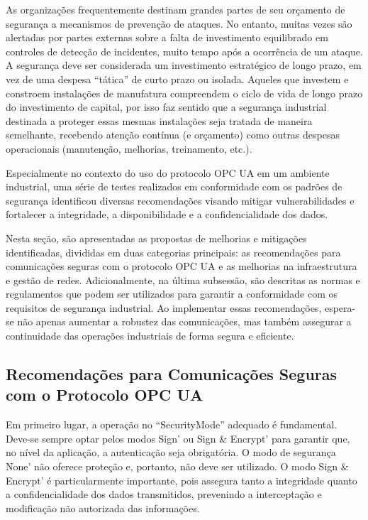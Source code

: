     As organizações frequentemente destinam grandes partes de seu orçamento de segurança a mecanismos de prevenção de ataques. No entanto, muitas vezes são alertadas por partes externas sobre a falta de investimento equilibrado em controles de detecção de incidentes, muito tempo após a ocorrência de um ataque. A segurança deve ser considerada um investimento estratégico de longo prazo, em vez de uma despesa ``tática'' de curto prazo ou isolada. Aqueles que investem e constroem instalações de manufatura compreendem o ciclo de vida de longo prazo do investimento de capital, por isso faz sentido que a segurança industrial destinada a proteger essas mesmas instalações seja tratada de maneira semelhante, recebendo atenção contínua (e orçamento) como outras despesas operacionais (manutenção, melhorias, treinamento, etc.).

    Especialmente no contexto do uso do protocolo OPC UA em um ambiente industrial, uma série de testes realizados em conformidade com os padrões de segurança identificou diversas recomendações visando mitigar vulnerabilidades e fortalecer a integridade, a disponibilidade e a confidencialidade dos dados.

    Nesta seção, são apresentadas as propostas de melhorias e mitigações identificadas, divididas em duas categorias principais: as recomendações para comunicações seguras com o protocolo OPC UA e as melhorias na infraestrutura e gestão de redes. Adicionalmente, na última subsessão, são descritas as normas e regulamentos que podem ser utilizados para garantir a conformidade com os requisitos de segurança industrial. Ao implementar essas recomendações, espera-se não apenas aumentar a robustez das comunicações, mas também assegurar a continuidade das operações industriais de forma segura e eficiente.

    \subsection{Recomendações para Comunicações Seguras com o Protocolo OPC UA}

Em primeiro lugar, a operação no ``SecurityMode'' adequado é fundamental. Deve-se sempre optar pelos modos Sign' ou Sign \& Encrypt' para garantir que, no nível da aplicação, a autenticação seja obrigatória. O modo de segurança None' não oferece proteção e, portanto, não deve ser utilizado. O modo Sign \& Encrypt' é particularmente importante, pois assegura tanto a integridade quanto a confidencialidade dos dados transmitidos, prevenindo a interceptação e modificação não autorizada das informações.

